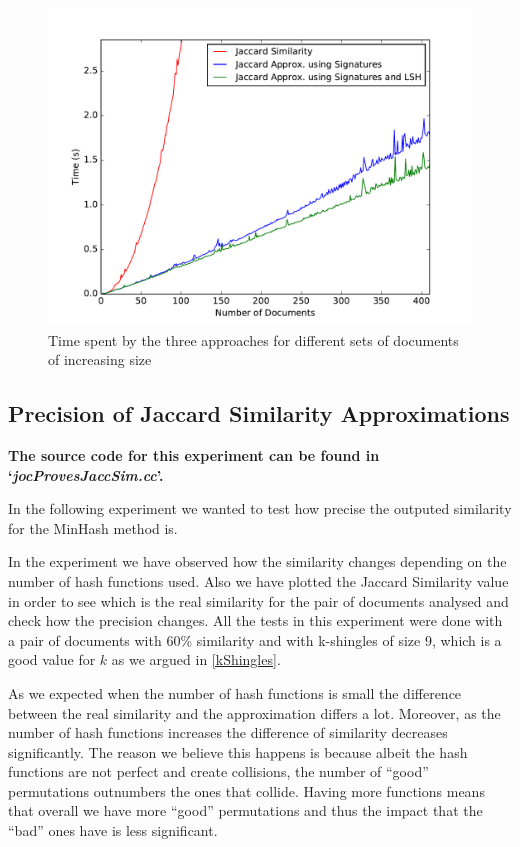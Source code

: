 \documentclass[12pt]{article}
\begin{document}
{\begin{figure}[H]
	\centering
	\includegraphics[scale=0.55]{graphs/JaccardSignatureLSHTimes.pdf}
	\caption{Time spent by the three approaches for different sets of documents of increasing size}
	\label{fig:JaccSignLSH}
\end{figure}

\subsection{Precision of Jaccard Similarity Approximations}
\textbf{The source code for this experiment can be found in `\textit{jocProvesJaccSim.cc}'.}
\medskip

In the following experiment we wanted to test how precise the outputed similarity for the MinHash method is. 

\bigskip
In the experiment we have observed how the similarity changes depending on the number of hash functions used. Also we have plotted the Jaccard Similarity value in order to see which is the real similarity for the pair of documents analysed and check how the precision changes. 
All the tests in this experiment were done with a pair of documents with 60\% similarity and with k-shingles of size 9, which is a good value for $k$ as we argued in \autoref{kShingles}. 

\bigskip
As we expected when the number of hash functions is small the difference between the real similarity and the approximation differs a lot. Moreover, as the number of hash functions increases the difference of similarity decreases significantly.  The reason we believe this happens is because albeit the hash functions are not perfect and create collisions, the number of ``good'' permutations outnumbers the ones that collide. Having more functions means that overall we have more ``good'' permutations and thus the impact that the ``bad'' ones have is less significant.


}
\end{document}
